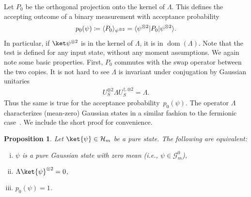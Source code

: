 \documentclass[11pt,a4paper]{article}
\newtheorem{proposition}[theorem]{Proposition}\AddToHook{env/proposition/begin}{\crefalias{theorem}{proposition}}\crefname{proposition}{Proposition}{Propositions}
\numberwithin{equation}{section}
\newcommand{\ot}{\otimes}
\newcommand{\HH}{\mathcal{H}}
\newcommand{\GG}{\mathcal G}
\newcommand{\1}{\mathbf{1}}
\DeclareMathOperator{\dom}{dom}
\DeclarePairedDelimiter\angles{\langle}{\rangle}
\DeclarePairedDelimiter\ip{\langle}{\rangle}
\begin{document}
Let $P_0$ be the orthogonal projection onto the kernel of $\Lambda$.
This defines the accepting outcome of a binary measurement with acceptance probability
\[ p_0(\psi) \coloneqq \ip{P_0}_{\psi^{\ot 2}} = \angles{\psi^{\ot 2} | P_0 | \psi^{\ot 2}}. \]
In particular, if $\ket\psi^{\ot2}$ is in the kernel of $\Lambda$, it is in $\dom(\Lambda)$.
Note that the test is defined for any input state, without any moment assumptions.
We again note some basic properties.
First, $P_0$ commutes with the swap operator between the two copies.
It is not hard to see $\Lambda$ is invariant under conjugation by Gaussian unitaries
\begin{align}\label{eq:lambda-commutes-gaussian}
    U_S^{\ot 2}  \Lambda U_S^{\dagger, \ot 2} = \Lambda.
\end{align}
Thus the same is true for the acceptance probability~$p_0(\psi)$.
The operator $\Lambda$ characterizes (mean-zero) Gaussian states in a similar fashion to the fermionic case~\cite{girardi2025gaussian}.
We include the short proof for convenience.

\begin{proposition}\label{prp:mean-zero-gaussian}
    Let $\ket{\psi} \in \HH_m$ be a pure state. The following are equivalent:
    \begin{enumerate}[(i),itemsep=0pt]
        \item\label{it:state-gaussian} $\psi$ is a pure Gaussian state with zero mean (i.e., $\psi \in \GG_m^0$),
        \item\label{it:lambda-annihilates} $\Lambda \ket{\psi}^{\ot 2} = 0$,
        \item\label{it:p-acc-one} $p_0(\psi) = 1$.
    \end{enumerate}
\end{proposition}
\end{document}
